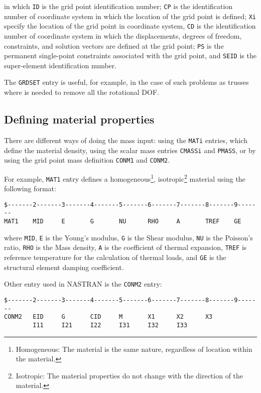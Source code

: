 in which \texttt{ID} is the grid point identification number; \texttt{CP} is the identification number of coordinate system in which the location of the grid point is defined; \texttt{Xi} specify the location of the grid point in coordinate system, \texttt{CD} is the identification number of coordinate system in which the displacements, degrees of freedom, constraints, and solution vectors are defined at the grid point; \texttt{PS} is the permanent single-point constraints associated with the grid point, and \texttt{SEID} is the super-element identification number.

The \texttt{GRDSET} entry is useful, for example, in the case of such problems as trusses where is needed to remove all the rotational DOF.

\subsection{Defining material properties}

There are different ways of doing the mass input: using the \texttt{MATi} entries, which define the material density, using the scalar mass entries \texttt{CMASSi} and \texttt{PMASS}, or by using the grid point mass definition \texttt{CONM1} and \texttt{CONM2}.

For example, \texttt{MAT1} entry defines a homogeneous\footnote{Homogeneous: The material is the same nature, regardless of location within the material.}, isotropic\footnote{Isotropic: The material properties do not change with the direction of the material.} material using the following format:

\begin{lstlisting}
$-------2-------3-------4-------5-------6-------7-------8-------9-------
MAT1    MID     E       G       NU      RHO     A       TREF    GE
\end{lstlisting}

where \texttt{MID}, \texttt{E} is the Young's modulus, \texttt{G} is the Shear modulus, \texttt{NU} is the Poisson's ratio, \texttt{RHO} is the Mass density, \texttt{A} is the coefficient of thermal expansion, \texttt{TREF} is reference temperature for the calculation of thermal loads, and \texttt{GE} is the structural element damping coefficient.

Other entry used in NASTRAN is the \texttt{CONM2} entry:

\begin{lstlisting}
$-------2-------3-------4-------5-------6-------7-------8-------9-------
CONM2   EID     G       CID     M       X1      X2      X3 
        I11     I21     I22     I31     I32     I33
\end{lstlisting}


